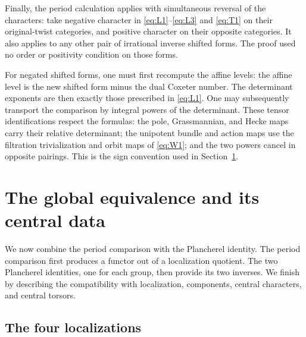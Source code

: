 \documentclass[11pt]{article}
\numberwithin{equation}{section}
\theoremstyle{definition}
\theoremstyle{remark}
\begin{document}
Finally, the period calculation applies with simultaneous reversal of the
characters: take negative character in \eqref{eq:L1}--\eqref{eq:L3} and
\eqref{eq:T1} on their original-twist categories, and positive character
on their opposite categories.  It also applies to any other pair of
irrational inverse shifted forms.  The proof used no order or positivity
condition on those forms.

For negated shifted forms, one must first recompute the affine levels:
the affine level is the new shifted form minus the dual Coxeter number.
The determinant exponents are then exactly those prescribed in
\eqref{eq:L1}.  One may subsequently transport the comparison by integral
powers of the determinant.  These tensor identifications respect the
formulas: the pole, Grassmannian, and Hecke maps carry their relative
determinant; the unipotent bundle and action maps use the filtration
trivialization and orbit maps of \eqref{eq:W1}; and the two powers cancel
in opposite pairings.  This is the sign convention used in
Section~\ref{sec:equivalence}.

\section{The global equivalence and its central data}
\label{sec:equivalence}

We now combine the period comparison with the Plancherel identity.  The
period comparison first produces a functor out of a localization quotient.
The two Plancherel identities, one for each group, then provide its two
inverses.  We finish by describing the compatibility with localization,
components, central characters, and central torsors.

\subsection{The four localizations}
\end{document}
